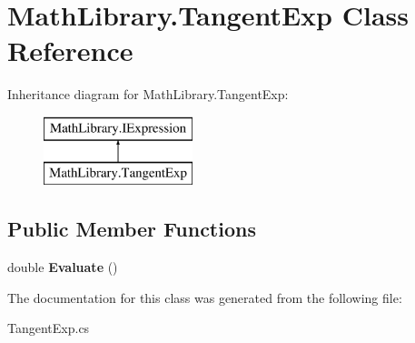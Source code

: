 \hypertarget{class_math_library_1_1_tangent_exp}{}\section{Math\+Library.\+Tangent\+Exp Class Reference}
\label{class_math_library_1_1_tangent_exp}
Inheritance diagram for Math\+Library.\+Tangent\+Exp\+:\begin{figure}[H]
\begin{center}
\leavevmode
\includegraphics[height=2.000000cm]{class_math_library_1_1_tangent_exp}
\end{center}
\end{figure}
\subsection*{Public Member Functions}
\begin{DoxyCompactItemize}
\item 
\mbox{\label{class_math_library_1_1_tangent_exp_ac9545fe7ec78b4789e39b2d234dc7f4d}} 
double {\bfseries Evaluate} ()
\end{DoxyCompactItemize}


The documentation for this class was generated from the following file\+:\begin{DoxyCompactItemize}
\item 
Tangent\+Exp.\+cs\end{DoxyCompactItemize}
